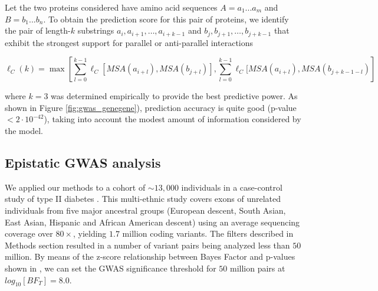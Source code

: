 \begin{figure}
\begin{subfigure}{.1\textwidth}
  \label{fig:sub2}
\end{subfigure}
\label{fig:gwas_jmol}
\end{figure}

Let the two proteins considered have amino acid sequences $A = a_1...a_m$ and $B = b_1...b_n$. To obtain the prediction score for this pair of proteins, we identify the pair of length-$k$ substrings $a_i, a_{i+1}, …, a_{i+k-1}$ and $b_j, b_{j+1}, …, b_{j+k-1}$ that exhibit the strongest support for parallel or anti-parallel interactions

\[
\ell_C(k) = \max\left[ \sum_{l=0}^{k-1}{ \ell_C[ MSA(a_{i+l}) , MSA(b_{j+l}) ]},  \sum_{l=0}^{k-1}{\ell_C[ MSA(a_{i+l}) , MSA(b_{j+k-1-l})} \right]
\]

\noindent where $k=3$ was determined empirically to provide the best predictive power. 
As shown in Figure \ref{fig:gwas_genegene}), prediction accuracy is quite good (p-value $< 2 \cdot 10^{-42}$), taking into account the modest amount of information considered by the model.

\subsection{Epistatic GWAS analysis}

We applied our methods to a cohort of $\sim 13,000$ individuals in a case-control study of type II diabetes \cite{mccarthy2015T2D}.
This multi-ethnic study covers exons of unrelated individuals from five major ancestral groups (European descent, South Asian, East Asian, Hispanic and African American descent) using an average sequencing coverage over $80 \times$, yielding $1.7$ million coding variants. The filters described in Methods section resulted in a number of variant pairs being analyzed less than $50$ million. By means of the z-score relationship between Bayes Factor and p-values shown in \cite{goodman1999toward}, we can set the GWAS significance threshold for $50$ million pairs at $log_{10}[BF_T] =  8.0$.

